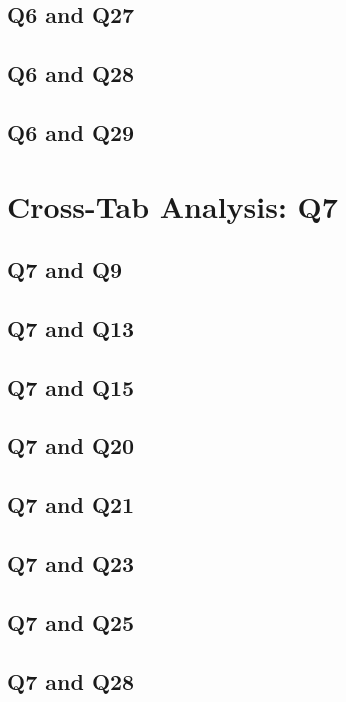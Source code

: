 \documentclass{report}
\begin{document}
\section{Q6 and Q27}\clearpage
\section{Q6 and Q28}\clearpage
\section{Q6 and Q29}\clearpage

\chapter{Cross-Tab Analysis: Q7}

\section{Q7 and Q9}\clearpage
\section{Q7 and Q13}\clearpage
\section{Q7 and Q15}\clearpage
\section{Q7 and Q20}\clearpage
\section{Q7 and Q21}\clearpage
\section{Q7 and Q23}\clearpage
\section{Q7 and Q25}\clearpage
\section{Q7 and Q28}\clearpage
\end{document}
